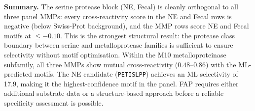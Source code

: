 \documentclass[10pt,a4paper]{article}
\begin{document}
\begin{tcolorbox}[colback=gray!7, colframe=gray!40, boxrule=0.4pt,
  arc=2pt, left=6pt, right=6pt, top=4pt, bottom=4pt]
  \textbf{Summary.} The serine protease block (NE, Fecal) is cleanly orthogonal to all
  three panel MMPs: every cross-reactivity score in the NE and Fecal rows is negative
  (below Swiss-Prot background), and the MMP rows score NE and Fecal motifs at
  $\leq -0.10$. This is the strongest structural result: the protease class boundary
  between serine and metalloprotease families is sufficient to ensure selectivity without
  motif optimisation. Within the M10 metalloproteinase subfamily, all three MMPs show
  mutual cross-reactivity ($0.48$--$0.86$) with the ML-predicted motifs. The NE
  candidate (\texttt{PETISLPP}) achieves an ML selectivity of 17.9, making it the
  highest-confidence motif in the panel. FAP requires either additional substrate data
  or a structure-based approach before a reliable specificity assessment is possible.
\end{tcolorbox}
\end{document}
